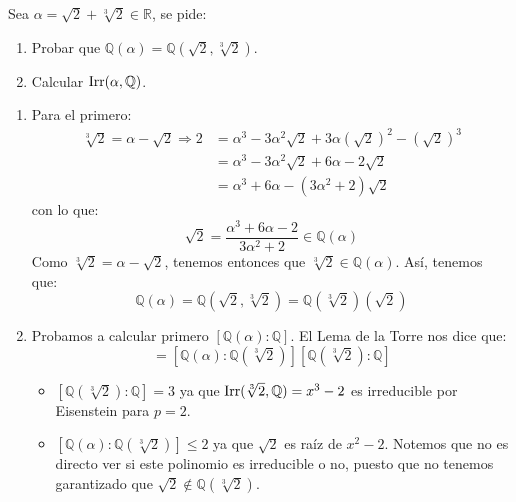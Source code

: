 \begin{ejercicio}
    Sea $\alpha = \sqrt{2}+\sqrt[3]{2}\in \mathbb{R}$, se pide:
    \begin{enumerate}[label=\alph*)]
        \item Probar que $\mathbb{Q}(\alpha) = \mathbb{Q}(\sqrt{2},\sqrt[3]{2})$.
        \item Calcular $\operatorname{Irr}(\alpha,\mathbb{Q})$.
    \end{enumerate}
    \begin{enumerate}[label=\alph*)]
        \item Para el primero:
            \begin{align*}
                \sqrt[3]{2} = \alpha - \sqrt{2} \Longrightarrow 2&=\alpha^3 - 3\alpha^2\sqrt{2} + 3\alpha{(\sqrt{2})}^{2} - {(\sqrt{2})}^{3} \\
                                                &=\alpha^3 - 3\alpha^2\sqrt{2}+6\alpha - 2\sqrt{2} \\
                                                &=\alpha^3 + 6\alpha-(3\alpha^2 +2)\sqrt{2}
            \end{align*}
            con lo que:
            \begin{equation*}
                \sqrt{2} = \dfrac{\alpha^3 + 6\alpha - 2}{3\alpha^2 + 2}\in \mathbb{Q}(\alpha)
            \end{equation*}
            Como $\sqrt[3]{2} = \alpha-\sqrt{2}$, tenemos entonces que $\sqrt[3]{2}\in \mathbb{Q}(\alpha)$. Así, tenemos que:
            \begin{equation*}
                \mathbb{Q}(\alpha) = \mathbb{Q}(\sqrt{2},\sqrt[3]{2}) = \mathbb{Q}(\sqrt[3]{2})(\sqrt{2})
            \end{equation*}
        \item Probamos a calcular primero $[\mathbb{Q}(\alpha):\mathbb{Q}]$. El Lema de la Torre nos dice que:
            \begin{equation*}
                [\mathbb{Q}(\alpha):\mathbb{Q}] = [\mathbb{Q}(\alpha):\mathbb{Q}(\sqrt[3]{2})][\mathbb{Q}(\sqrt[3]{2}):\mathbb{Q}]
            \end{equation*}
            \begin{itemize}
                \item $[\mathbb{Q}(\sqrt[3]{2}):\mathbb{Q}] = 3$ ya que $\operatorname{Irr}(\sqrt[3]{2},\mathbb{Q}) = x^3-2$ es irreducible por Eisenstein para $p=2$.
                \item $[\mathbb{Q}(\alpha):\mathbb{Q}(\sqrt[3]{2})] \leq 2$ ya que $\sqrt{2}$ es raíz de $x^2-2$. Notemos que no es directo ver si este polinomio es irreducible o no, puesto que no tenemos garantizado que $\sqrt{2}\notin \mathbb{Q}(\sqrt[3]{2})$.
            \end{itemize}


\end{enumerate}
\end{ejercicio}
